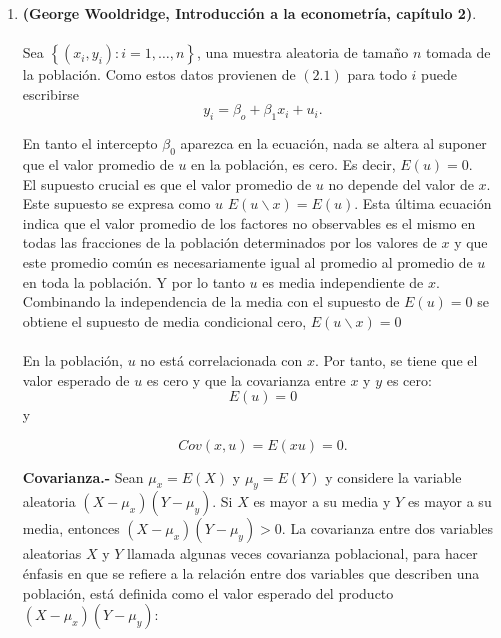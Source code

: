 \begin{enumerate}
    \begin{enumerate}[\bfseries a)]

	\item \textbf{(George Wooldridge, Introducción a la econometría, capítulo 2)}.\\\\ Sea $\left\{(x_i,y_i): i = 1,\ldots,n\right\}$, una muestra aleatoria de tamaño $n$ tomada de la población. Como estos datos provienen de $(2.1)$ para todo $i$ puede escribirse 
\begin{equation}
    y_i = \beta_o + \beta_1x_i + u_i.
\end{equation}

En tanto el intercepto $\beta_0$ aparezca en la ecuación, nada se altera al suponer que el valor promedio de $u$ en la población, es cero. Es decir, $E(u)=0$.\\
El supuesto crucial es que el valor promedio de $u$ no depende del valor de $x$. Este supuesto se expresa como $u$ $E(u\backslash x) = E(u)$. Esta última ecuación indica que el valor promedio de los factores no observables es el mismo en todas las fracciones de la población determinados por los valores de $x$ y que este promedio común es necesariamente igual al promedio al promedio de $u$ en toda la población. Y por lo tanto $u$ es media independiente de $x$. Combinando la independencia de la media con el supuesto de $E(u)=0$ se obtiene el supuesto de media condicional cero, $E(u\backslash x) = 0$\\\\

En la población, $u$ no está correlacionada con $x$. Por tanto, se tiene que el valor esperado de $u$ es cero y que la covarianza entre $x$ y $y$ es cero:
\begin{equation}
    E(u)=0
\end{equation}
 y 

\begin{equation}
    Cov(x,u) = E(xu) =0.
\end{equation}

\textbf{Covarianza.-} Sean $\mu_x = E(X)$ y $\mu_y = E(Y)$ y considere la variable aleatoria $(X-\mu_x)(Y-\mu_y)$. Si $X$ es mayor a su media y $Y$ es mayor a su media, entonces $(X-\mu_x)(Y-\mu_y)>0$. La covarianza entre dos variables aleatorias $X$ y $Y$ llamada algunas veces covarianza poblacional, para hacer énfasis en que se refiere a la relación entre dos variables que describen una población, está definida como el valor esperado del producto $(X-\mu_x)(Y-\mu_y)$: 


\end{enumerate}
\end{enumerate}
